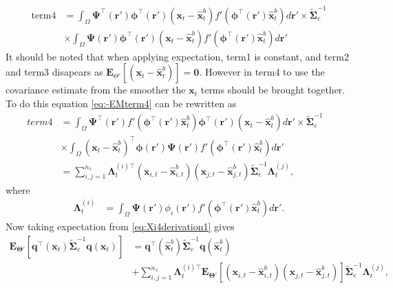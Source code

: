 \documentclass[]{article}
\begin{document}
\begin{align}\label{eq:-EMterm4}
 \mathrm{term4} &=\int_\Omega \boldsymbol{\Psi}^\top(\mathbf{r}')\boldsymbol \phi^\top(\mathbf r') (\mathbf x_t - \mathbf  {\hat x}_t^b)f'(\boldsymbol \phi^\top(\mathbf r')\mathbf {\hat x}_t^b) d\mathbf{r}' \times \tilde{\boldsymbol  \Sigma}_e^{-1} \nonumber \\
&\times \int_\Omega \boldsymbol{\Psi}(\mathbf{r}')\boldsymbol \phi^\top(\mathbf r') (\mathbf x_t - \mathbf  {\hat x}_t^b)f'(\boldsymbol \phi^\top(\mathbf r')\mathbf {\hat x}_t^b) d\mathbf{r}' 
\end{align}
It should be noted that when applying expectation, term1 is constant, and term2 and term3 disapears as $\mathbf E_{\Theta'}\left[(\mathbf x_t - \mathbf  {\hat x}_t^b)\right]= \mathbf 0$. However in term4 to use the covariance estimate from the smoother the $\mathbf{x}_t$ terms should be brought together. To do this equation \eqref{eq:-EMterm4} can be rewritten as 
\begin{align}
 term4 &= \int_\Omega \boldsymbol{\Psi}^\top(\mathbf{r}')f'(\boldsymbol \phi^\top(\mathbf r')\mathbf {\hat x}_t^b) \boldsymbol \phi^\top(\mathbf r')(\mathbf x_t - \mathbf  {\hat x}_t^b)d\mathbf{r}' \times \tilde{\boldsymbol\Sigma}_e^{-1} \nonumber \\
&\times\int_\Omega  (\mathbf x_t - \mathbf  {\hat x}_t^b)^\top\boldsymbol \phi(\mathbf r') \boldsymbol{\Psi}(\mathbf{r}')f'(\boldsymbol \phi^\top(\mathbf r')\mathbf {\hat x}_t^b) d\mathbf{r}'& \nonumber \\
&=\sum_{i,j=1}^{n_x}{\boldsymbol\Lambda}_t^{(i)\top}(\mathbf x_{i,t} - \mathbf  {\hat x}_{i,t}^b)(\mathbf x_{j,t} - \mathbf  {\hat x}_{j,t}^b)\tilde{\boldsymbol\Sigma}_e^{-1}{\boldsymbol\Lambda}_t^{(j)},
\end{align}
where
\begin{align}
	{\boldsymbol \Lambda}_t^{(i)}&=\int_{\Omega} \boldsymbol \Psi(\mathbf r')\phi_i(\mathbf r')f'(\boldsymbol\phi^\top(\mathbf r')\mathbf {\hat x}_t^b)d\mathbf r' \label{eq:lambdatildei}.
\end{align}
Now taking expectation from \eqref{eq:Xi4derivation1} gives
\begin{align}\label{eq:Xi4derivation2}
  \mathbf{E}_{\boldsymbol\Theta'}\left[ \mathbf q^\top(\mathbf x_t)\tilde{\boldsymbol\Sigma}_e^{-1}\mathbf q(\mathbf x_t)\right] &= \mathbf q^\top(\mathbf {\hat x}_t^b)\tilde{\boldsymbol\Sigma}_e^{-1}\mathbf q(\mathbf {\hat x}_t^b)\nonumber \\
&+\sum_{i,j=1}^{n_x}{\boldsymbol\Lambda}_t^{(i)\top}\mathbf{E}_{\boldsymbol\Theta'}\left[(\mathbf x_{i,t} - \mathbf  {\hat x}_{i,t}^b)(\mathbf x_{j,t} - \mathbf  {\hat x}_{j,t}^b)\right] \tilde{\boldsymbol\Sigma}_e^{-1}{\boldsymbol\Lambda}_t^{(j)},
\end{align}
\end{document}

